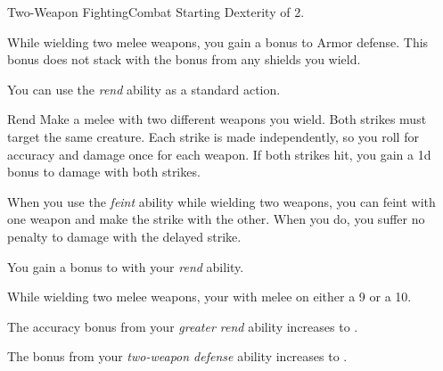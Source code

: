     \begin{feat}{Two-Weapon Fighting}{Combat}
        \featpre Starting Dexterity of 2.

         While wielding two melee weapons, you gain a  bonus to Armor defense.
        This bonus does not stack with the bonus from any shields you wield.

         You can use the \textit{rend} ability as a standard action.
        \begin{apability}{Rend}
            Make a melee  with two different weapons you wield.
            Both strikes must target the same creature.
            Each strike is made independently, so you roll for accuracy and damage once for each weapon.
            If both strikes hit, you gain a \plus1d bonus to damage with both strikes.
        \end{apability}

         When you use the \textit{feint} ability while wielding two weapons, you can feint with one weapon and make the strike with the other.
        When you do, you suffer no penalty to damage with the delayed strike.

         You gain a  bonus to  with your \textit{rend} ability.

         While wielding two melee weapons, your  with melee   on either a 9 or a 10.

         The accuracy bonus from your \textit{greater rend} ability increases to .

         The bonus from your \textit{two-weapon defense} ability increases to .
    \end{feat}

